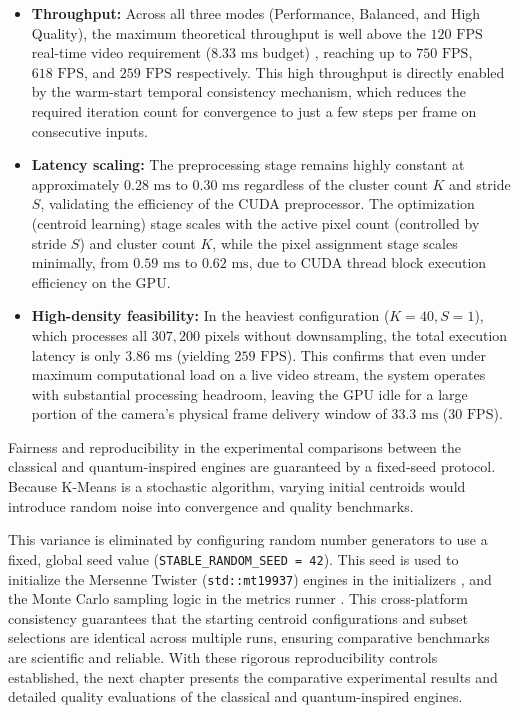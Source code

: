 \begin{itemize}
    \item \textbf{Throughput:} Across all three modes (Performance, Balanced, and High Quality), the maximum theoretical throughput is well above the $120\text{ FPS}$ real-time video requirement ($8.33\text{ ms}$ budget) \cite{jerald2009scene}, reaching up to $750\text{ FPS}$, $618\text{ FPS}$, and $259\text{ FPS}$ respectively. This high throughput is directly enabled by the warm-start temporal consistency mechanism, which reduces the required iteration count for convergence to just a few steps per frame on consecutive inputs.
    \item \textbf{Latency scaling:} The preprocessing stage remains highly constant at approximately $0.28\text{ ms}$ to $0.30\text{ ms}$ regardless of the cluster count $K$ and stride $S$, validating the efficiency of the CUDA preprocessor. The optimization (centroid learning) stage scales with the active pixel count (controlled by stride $S$) and cluster count $K$, while the pixel assignment stage scales minimally, from $0.59\text{ ms}$ to $0.62\text{ ms}$, due to CUDA thread block execution efficiency on the GPU.
    \item \textbf{High-density feasibility:} In the heaviest configuration ($K=40, S=1$), which processes all $307,200$ pixels without downsampling, the total execution latency is only $3.86\text{ ms}$ (yielding $259\text{ FPS}$). This confirms that even under maximum computational load on a live video stream, the system operates with substantial processing headroom, leaving the GPU idle for a large portion of the camera's physical frame delivery window of $33.3\text{ ms}$ ($30\text{ FPS}$).
\end{itemize}

\label{sect:scientific_reproducibility}
Fairness and reproducibility in the experimental comparisons between the classical and quantum-inspired engines are guaranteed by a fixed-seed protocol. Because K-Means is a stochastic algorithm, varying initial centroids would introduce random noise into convergence and quality benchmarks.

This variance is eliminated by configuring random number generators to use a fixed, global seed value (\texttt{STABLE\_RANDOM\_SEED = 42}). This seed is used to initialize the Mersenne Twister (\texttt{std::mt19937}) engines in the initializers \cite{matsumoto1998mersenne, stroustrup2022tour}, and the Monte Carlo sampling logic in the metrics runner \cite{shutaywi2021silhouette}. This cross-platform consistency guarantees that the starting centroid configurations and subset selections are identical across multiple runs, ensuring comparative benchmarks are scientific and reliable. With these rigorous reproducibility controls established, the next chapter presents the comparative experimental results and detailed quality evaluations of the classical and quantum-inspired engines.

